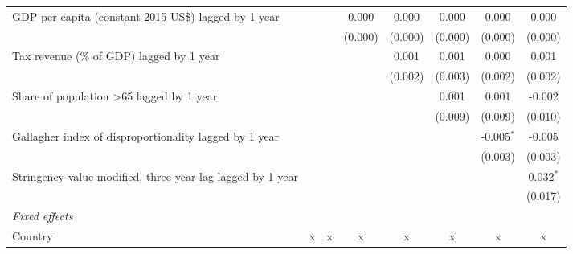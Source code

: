 \begin{tabular}{lccccccc}
   GDP per capita (constant 2015 US\$) lagged by 1 year                          &                &                & 0.000         & 0.000          & 0.000         & 0.000          & 0.000\\   
                                                                                 &                &                & (0.000)       & (0.000)        & (0.000)       & (0.000)        & (0.000)\\   
   Tax revenue (\% of GDP) lagged by 1 year                                      &                &                &               & 0.001          & 0.001         & 0.000          & 0.001\\   
                                                                                 &                &                &               & (0.002)        & (0.003)       & (0.002)        & (0.002)\\   
   Share of population >65 lagged by 1 year                                      &                &                &               &                & 0.001         & 0.001          & -0.002\\   
                                                                                 &                &                &               &                & (0.009)       & (0.009)        & (0.010)\\   
   Gallagher index of disproportionality lagged by 1 year                        &                &                &               &                &               & -0.005$^{*}$   & -0.005\\   
                                                                                 &                &                &               &                &               & (0.003)        & (0.003)\\   
   Stringency value modified, three-year lag lagged by 1 year                    &                &                &               &                &               &                & 0.032$^{*}$\\   
                                                                                 &                &                &               &                &               &                & (0.017)\\   
   \emph{Fixed effects}\\
   Country                                                                       & x              & x              & x             & x              & x             & x              & x\\  

\end{tabular}
